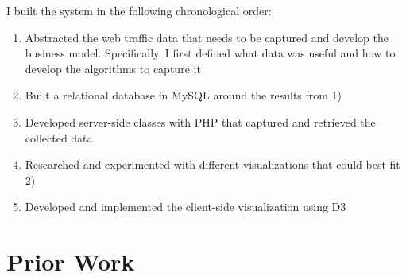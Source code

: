 \documentclass[12pt]{article}
\begin{document}
I built the system in the following chronological order:
\begin{enumerate}
\item Abstracted the web traffic data that needs to be captured and develop the business model. Specifically, I first defined what data was useful and how to develop the algorithms to capture it
\item Built a relational database in MySQL around the results from 1)
\item Developed server-side classes with PHP that captured and retrieved the collected data
\item Researched and experimented with different visualizations that could best fit 2)
\item Developed and implemented the client-side visualization using D3
\end{enumerate}

\vfill

\section{Prior Work}
\end{document}
